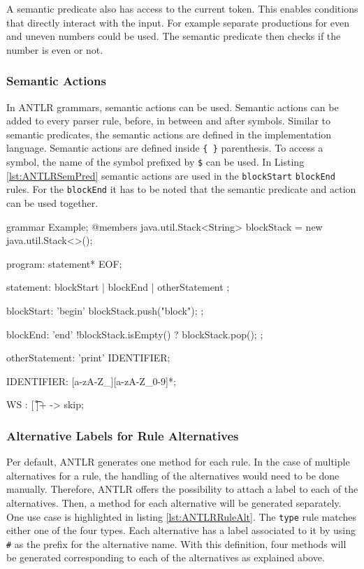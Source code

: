 A semantic predicate also has access to the current token. This enables conditions that directly interact with the input. For example separate productions for even and uneven numbers could be used. The semantic predicate then checks if the number is even or not.  


\subsubsection{Semantic Actions}

In ANTLR grammars, semantic actions can be used. Semantic actions can be added to every parser rule, before, in between and after symbols. Similar to semantic predicates, the semantic actions are defined in the implementation language. Semantic actions are defined inside \verb|{ }| parenthesis. To access a symbol, the name of the symbol prefixed by \verb|$| can be used. In Listing \ref{lst:ANTLRSemPred} semantic actions are used in the \texttt{blockStart} \texttt{blockEnd} rules. For the \texttt{blockEnd} it has to be noted that the semantic predicate and action can be used together. 


\begin{AntlrCode}[float,numbers=none,caption=Example grammar using a semantic predicate and a semantic action., label=lst:ANTLRSemPred]
grammar Example;
@members {
    java.util.Stack<String> blockStack = new java.util.Stack<>();
}

program: statement* EOF;

statement: 
      blockStart
    | blockEnd
    | otherStatement
    ;

blockStart: 'begin' { blockStack.push("block"); };

blockEnd: 'end' { !blockStack.isEmpty() }? { blockStack.pop(); };

otherStatement: 'print' IDENTIFIER;

IDENTIFIER: [a-zA-Z_][a-zA-Z_0-9]*;

WS  : [ \t\r\n]+ -> skip;
\end{AntlrCode}


\subsubsection{Alternative Labels for Rule Alternatives}

Per default, ANTLR generates one method for each rule. In the case of multiple alternatives for a rule, the handling of the alternatives would need to be done manually. Therefore, ANTLR offers the possibility to attach a label to each of the alternatives. Then, a method for each alternative will be generated separately. One use case is highlighted in listing \ref{lst:ANTLRRuleAlt}. The \texttt{type} rule matches either one of the four types. Each alternative has a label associated to it by using \verb|#| as the prefix for the alternative name. With this definition, four methods will be generated corresponding to each of the alternatives as explained above.     


